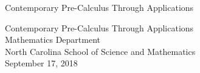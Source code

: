 \documentclass[10pt,]{book}
\theoremstyle{ptxdefinitionnotitle}
\theoremstyle{ptxdefinitiontitle}
\numberwithin{equation}{section}
\begin{document}
\frontmatter
\thispagestyle{empty}
{\centering
\vspace*{0.28\textheight}
{\Huge Contemporary Pre-Calculus Through Applications}\\}
\clearpage
\thispagestyle{empty}
\null%
\clearpage
\thispagestyle{empty}
{\centering
\vspace*{0.14\textheight}
{\Huge Contemporary Pre-Calculus Through Applications}\\[3\baselineskip]
{\Large Mathematics Department}\\[0.5\baselineskip]
{\Large North Carolina School of Science and Mathematics}\\[3\baselineskip]
{\Large September 17, 2018}\\}
\clearpage
\thispagestyle{empty}
\null\clearpage
\setcounter{tocdepth}{1}
\renewcommand*\contentsname{Contents}
\tableofcontents
\mainmatter
\typeout{************************************************}
\typeout{************************************************}
\end{document}
